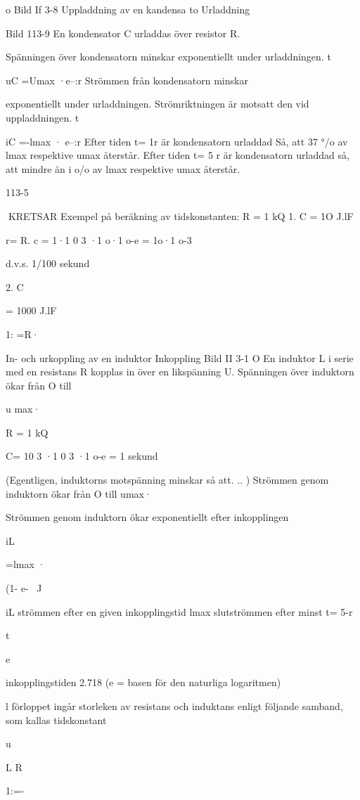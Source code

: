 o
Bild If 3-8 Uppladdning av en kandensa to
Urladdning

Bild 113-9
En kondensator C urladdas över resistor R.

Spänningen över kondensatorn minskar
exponentiellt under urladdningen.
t

uC =Umax ·e--:r
Strömmen från kondensatorn minskar

exponentiellt under urladdningen. Strömriktningen är motsatt den vid uppladdningen.
t

iC =-lmax · e--:r
Efter tiden t= 1r är kondensatorn urladdad Så, att 37 °/o av lmax respektive umax
återstår.
Efter tiden t= 5 r är kondensatorn urladdad så, att mindre än i o/o av lmax respektive
umax återstår.

113-5

KRETSAR
Exempel på beräkning av tidskonstanten:
R = 1 kQ
1. C = 1O J.lF

r= R. c = 1·1 0 3 ·1 o·1 o-e = 1o·1 o-3

d.v.s. 1/100 sekund

2. C

= 1000 J.lF

1: =R·

In- och urkoppling av en induktor
Inkoppling
Bild II 3-1 O
En induktor L i serie med en resistans R
kopplas in över en likspänning U.
Spänningen över induktorn ökar från O till

u max·

R = 1 kQ

C= 10 3 ·1 0 3 ·1 o-e = 1 sekund

(Egentligen, induktorns motspänning
minskar så att. .. )
Strömmen genom induktorn ökar från O
till umax·

Strömmen genom induktorn ökar exponentiellt efter inkopplingen

iL

=lmax ·

(1- e-~ J

iL strömmen efter en given inkopplingstid
lmax slutströmmen efter minst t= 5-r

t

e

inkopplingstiden
2.718 (e = basen för den naturliga
logaritmen)

l förloppet ingår storleken av resistans
och induktans enligt följande samband, som
kallas tidskonstant

u

L
R

1:=-

